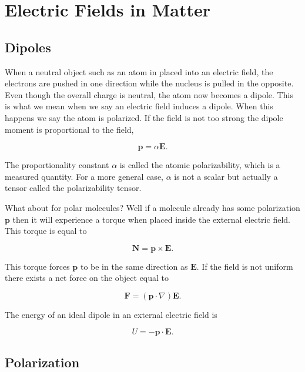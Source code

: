 \documentclass[preprint, review,12pt]{elsarticle}
\def\x{\times}
\def\.{\cdot}
\def\b{\textbf}
\begin{document}
\section{Electric Fields in Matter}

\subsection{Dipoles}

When a neutral object such as an atom in placed into an electric field, the electrons are pushed in one direction while the nucleus is pulled in the opposite. Even though the overall charge is neutral, the atom now becomes a dipole. This is what we mean when we say an electric field induces a dipole. When this happens we say the atom is polarized. If the field is not too strong the dipole moment is proportional to the field,

\begin{equation}
    \b{p} = \alpha \b{E}.
\end{equation}

The proportionality constant $\alpha$ is called the atomic polarizability, which is a measured quantity. For a more general case, $\alpha$ is not a scalar but actually a tensor called the polarizability tensor.  


What about for polar molecules? Well if a molecule already has some polarization $\b{p}$ then it will experience a torque when placed inside the external electric field. This torque is equal to 

\begin{equation}
    \b{N} = \b{p} \x \b{E}.
\end{equation}

This torque forces $\b{p}$ to be in the same direction as $\b{E}$. If the field is not uniform there exists a net force on the object equal to 

\begin{equation}
    \b{F} = (\b{p} \. \nabla)\b{E}.
\end{equation}

The energy of an ideal dipole in an external electric field is

\begin{equation}
    U = - \b{p} \. \b{E}.
\end{equation}

\subsection{Polarization}
\end{document}
